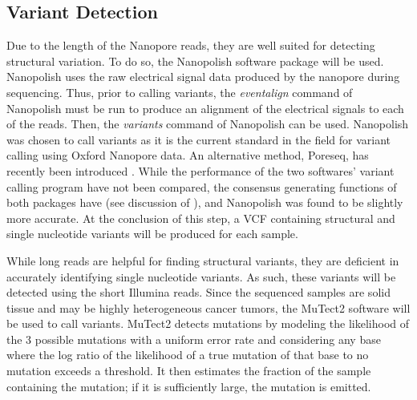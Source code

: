 \subsection{Variant Detection}

Due to the length of the Nanopore reads, they are well suited for detecting structural variation. To do so, the Nanopolish software package will be used. Nanopolish uses the raw electrical signal data produced by the nanopore during sequencing. Thus, prior to calling variants, the \textit{eventalign} command of Nanopolish must be run to produce an alignment of the electrical signals to each of the reads. Then, the \textit{variants} command of Nanopolish can be used. Nanopolish was chosen to call variants as it is the current standard in the field for variant calling using Oxford Nanopore data. An alternative method, Poreseq, has recently been introduced \parencite{szalay_novo_2015}. While the performance of the two softwares' variant calling program have not been compared, the consensus generating functions of both packages have (see discussion of \cite{szalay_novo_2015}), and Nanopolish was found to be slightly more accurate. At the conclusion of this step, a VCF containing structural and single nucleotide variants will be produced for each sample.

While long reads are helpful for finding structural variants, they are deficient in accurately identifying single nucleotide variants. As such, these variants will be detected using the short Illumina reads. Since the sequenced samples are solid tissue and may be highly heterogeneous cancer tumors, the MuTect2 software will be used to call variants. MuTect2 detects mutations by modeling the likelihood of the 3 possible mutations with a uniform error rate and considering any base where the log ratio of the likelihood of a true mutation of that base to no mutation exceeds a threshold. It then estimates the fraction of the sample containing the mutation; if it is sufficiently large, the mutation is emitted.

